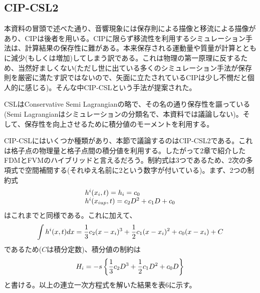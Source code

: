 \documentclass[dvipdfmx, 9pt, a4paper]{jsarticle}
\begin{document}
\subsection{CIP-CSL2}
本資料の冒頭で述べた通り、音響現象には保存則による描像と移流による描像があり、CIPは後者を用いる。CIPに限らず移流性を利用するシミュレーション手法は、計算結果の保存性に難がある。本来保存される運動量や質量が計算とともに減少(もしくは増加)してしまう訳である。これは物理の第一原理に反するため、当然好ましくない(ただし世に出ている多くのシミュレーション手法が保存則を厳密に満たす訳ではないので、矢面に立たされているCIPは少し不憫だと個人的に感じる)。そんな中CIP-CSLという手法が提案された。\par
CSLはConservative Semi Lagrangianの略で、その名の通り保存性を謳っている(Semi Lagrangianはシミュレーションの分類名で、本資料では議論しない)。そして、保存性を向上させるために積分値のモーメントを利用する。\par
CIP-CSLにはいくつか種類があり、本節で議論するのはCIP-CSL2である。これは格子点の物理量と格子点間の積分値を利用する。したがって2章で紹介したFDMとFVMのハイブリッドと言えるだろう。制約式は3つであるため、2次の多項式で空間補間する(それゆえ名前に2という数字が付いている)。まず、2つの制約式
\begin{equation}
\begin{array}{l}
h^i(x_i, t)=h_i=c_0 \\
h^i(x_{iup}, t)=c_2D^2+c_1D+c_0
\end{array} \notag
\end{equation}
はこれまでと同様である。これに加えて、
\begin{equation}
\int h^i(x, t) dx=\frac{1}{3}c_2(x-x_i)^3 + \frac{1}{2}c_1(x-x_i)^2 + c_0(x-x_i) + C \notag
\end{equation}
であるため($C$は積分定数)、積分値の制約は
\begin{equation}
H_i = -s\left\{ \frac{1}{3}c_2D^3 + \frac{1}{2}c_1D^2 + c_0D \right\} \notag
\end{equation}
と書ける。以上の連立一次方程式を解いた結果を表6に示す。\par

\begin{table}[b]
\begin{center}
\caption{CIP-CSL2における係数(表中$h$は列毎に$f$もしくは$g$に置き換える)}
\end{center}
\end{table}
\end{document}

